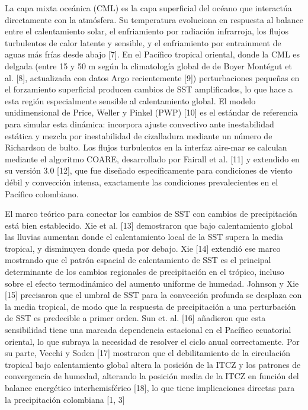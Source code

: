 \documentclass[12pt, letterpaper]{article}
\begin{document}
	La capa mixta oce\'anica (CML) es la capa superficial del oc\'eano que interact\'ua
	directamente con la atm\'osfera. Su temperatura evoluciona en respuesta al balance entre el
	calentamiento solar, el enfriamiento por radiaci\'on infrarroja, los flujos turbulentos de
	calor latente y sensible, y el enfriamiento por entrainment de aguas m\'as fr\'ias desde
	abajo [7]. En el Pac\'ifico tropical oriental, donde la CML es delgada (entre 15 y 50 m
	seg\'un la climatolog\'ia global de de Boyer Mont\'egut et al. [8], actualizada con datos
	Argo recientemente [9]) perturbaciones peque\~nas en el forzamiento superficial producen
	cambios de SST amplificados, lo que hace a esta regi\'on especialmente sensible al
	calentamiento global. El modelo unidimensional de Price, Weller y Pinkel (PWP) [10] es el
	est\'andar de referencia para simular esta din\'amica: incorpora ajuste convectivo ante
	inestabilidad est\'atica y mezcla por inestabilidad de cizalladura mediante un n\'umero de
	Richardson de bulto. Los flujos turbulentos en la interfaz aire-mar se calculan mediante el
	algoritmo COARE, desarrollado por Fairall et al. [11] y extendido en su versi\'on 3.0 [12],
	que fue dise\~nado espec\'ificamente para condiciones de viento d\'ebil y convecci\'on
	intensa, exactamente las condiciones prevalecientes en el Pac\'ifico colombiano.
	
	El marco te\'orico para conectar los cambios de SST con cambios de precipitaci\'on est\'a
	bien establecido. Xie et al. [13] demostraron que bajo calentamiento global las lluvias
	aumentan donde el calentamiento local de la SST supera la media tropical, y disminuyen donde
	queda por debajo. Xie [14] extendi\'o ese marco mostrando que el patr\'on espacial de
	calentamiento de SST es el principal determinante de los cambios regionales de precipitaci\'on
	en el tr\'opico, incluso sobre el efecto termodin\'amico del aumento uniforme de humedad.
	Johnson y Xie [15] precisaron que el umbral de SST para la convecci\'on profunda se desplaza
	con la media tropical, de modo que la respuesta de precipitaci\'on a una perturbaci\'on de
	SST es predecible a primer orden. Sun et. al. [16] a\~nadieron que esta sensibilidad tiene
	una marcada dependencia estacional en el Pac\'ifico ecuatorial oriental, lo que subraya la
	necesidad de resolver el ciclo anual correctamente. Por su parte, Vecchi y Soden [17]
	mostraron que el debilitamiento de la circulaci\'on tropical bajo calentamiento global altera
	la posici\'on de la ITCZ y los patrones de convergencia de humedad, alterando la posici\'on media de la ITCZ en funci\'on del balance energ\'etico interhemisf\'erico [18], lo que tiene implicaciones directas para la precipitaci\'on colombiana [1, 3]
	
\end{document}
